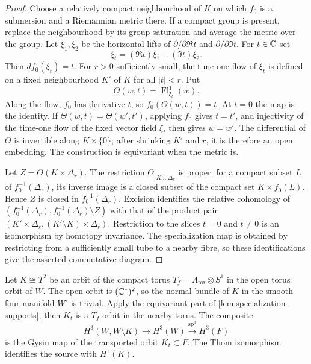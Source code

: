 \begin{proof}
Choose a relatively compact neighbourhood of $K$ on which $f_0$ is a
submersion and a Riemannian metric there.  If a compact group is present,
replace the neighbourhood by its group saturation and average the metric
over the group.  Let $\xi_1,\xi_2$ be the horizontal lifts of
$\partial/\partial\Re t$ and $\partial/\partial\Im t$.  For
$t\in\mathbb C$ set
\[
 \xi_t=(\Re t)\xi_1+(\Im t)\xi_2.
\]
Then $df_0(\xi_t)=t$.  For $r>0$ sufficiently small, the time-one flow of
$\xi_t$ is defined on a fixed neighbourhood $K'$ of $K$ for all
$|t|<r$.  Put
\[
 \Theta(w,t)=\operatorname{Fl}^{1}_{\xi_t}(w).
\]
Along the flow, $f_0$ has derivative $t$, so
$f_0(\Theta(w,t))=t$.  At $t=0$ the map is the identity.  If
$\Theta(w,t)=\Theta(w',t')$, applying $f_0$ gives $t=t'$, and injectivity
of the time-one flow of the fixed vector field $\xi_t$ then gives
$w=w'$.  The differential of $\Theta$ is invertible along
$K\times\{0\}$; after shrinking $K'$ and $r$, it is therefore an open
embedding.  The construction is equivariant when the metric is.

Let $Z=\Theta(K\times\Delta_r)$.  The restriction
$\Theta|_{K\times\Delta_r}$ is proper: for a compact subset $L$ of
$f_0^{-1}(\Delta_r)$, its inverse image is a closed subset of the compact
set $K\times f_0(L)$.  Hence $Z$ is closed in $f_0^{-1}(\Delta_r)$.  Excision identifies the relative
cohomology of $(f_0^{-1}(\Delta_r),f_0^{-1}(\Delta_r)\setminus Z)$ with
that of the product pair
$(K'\times\Delta_r,(K'\setminus K)\times\Delta_r)$.  Restriction to the
slices $t=0$ and $t\ne0$ is an isomorphism by homotopy invariance.  The
specialization map is obtained by restricting from a sufficiently small
tube to a nearby fibre, so these identifications give the asserted
commutative diagram.
\end{proof}

Let $K\cong T^2$ be an orbit of the compact torus
$T_f=\Lambda_{\mathrm{tor}}\otimes S^1$ in the open torus orbit of $W$.
The open orbit is $(\mathbb C^*)^2$, so the normal bundle of $K$ in the smooth
four-manifold $W^\circ$ is trivial.  Apply the equivariant part of
\cref{lem:specialization-supports}; then $K_t$ is a $T_f$-orbit in the
nearby torus.  The composite
\[
 H^3(W,W\setminus K)\longrightarrow H^3(W)
 \xrightarrow{\operatorname{sp}^3}H^3(F)
\]
is the Gysin map of the transported orbit $K_t\subset F$.  The Thom
isomorphism identifies the source with $H^1(K)$.

